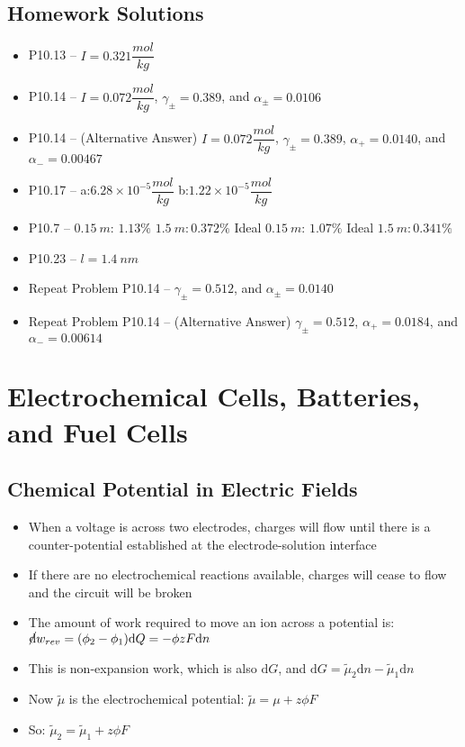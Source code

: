 \documentclass[12pt, openany, letterpaper]{memoir}
\begin{document}
\section*{Homework Solutions}
\begin{itemize}
	\item P10.13 -- $I = 0.321\dfrac{mol}{kg}$
	\item P10.14 -- $I = 0.072 \dfrac{mol}{kg}$, $\gamma_\pm = 0.389$, and $\alpha_\pm = 0.0106$
	\item P10.14 -- (Alternative Answer) $I = 0.072 \dfrac{mol}{kg}$, $\gamma_\pm = 0.389$, $\alpha_+ = 0.0140$, and $\alpha_- = 0.00467$
	\item P10.17 -- a:$6.28\times10^{-5}\dfrac{mol}{kg}$ \hspace{2em}b:$1.22\times10^{-5}\dfrac{mol}{kg}$
	\item P10.7 -- $0.15~m$: $1.13\%$ \hspace{2em} $1.5~m: 0.372\%$ \hspace{2em} Ideal $0.15~m$: $1.07\%$ \hspace{2em} Ideal $1.5~m: 0.341\%$
	\item P10.23 -- $l = 1.4~nm$
	\item Repeat Problem P10.14 -- $\gamma_\pm = 0.512$, and $\alpha_\pm = 0.0140$
	\item Repeat Problem P10.14 -- (Alternative Answer) $\gamma_\pm = 0.512$, $\alpha_+ = 0.0184$, and $\alpha_- = 0.00614$
\end{itemize}

\chapter{Electrochemical Cells, Batteries, and Fuel Cells}
\section*{Chemical Potential in Electric Fields}
\begin{itemize}
	\item When a voltage is across two electrodes, charges will flow until there is a counter-potential established at the electrode-solution interface
	\item If there are no electrochemical reactions available, charges will cease to flow and the circuit will be broken
	\item The amount of work required to move an ion across a potential is: $\cancel{\mathrm{d}}w_{rev}=(\phi_2-\phi_1)\mathrm{d}Q = -\phi zF\mathrm{d}n$
	\item This is non-expansion work, which is also $\mathrm{d} G$, and $\mathrm{d}G = \tilde{\mu}_2\mathrm{d}n - \tilde{\mu}_1\mathrm{d}n$
	\item Now $\tilde{\mu}$ is the electrochemical potential: $\tilde{\mu} = \mu + z\phi F$
	\item So: $\tilde{\mu}_2=\tilde{\mu}_1+z\phi F$
\end{itemize}
\end{document}
